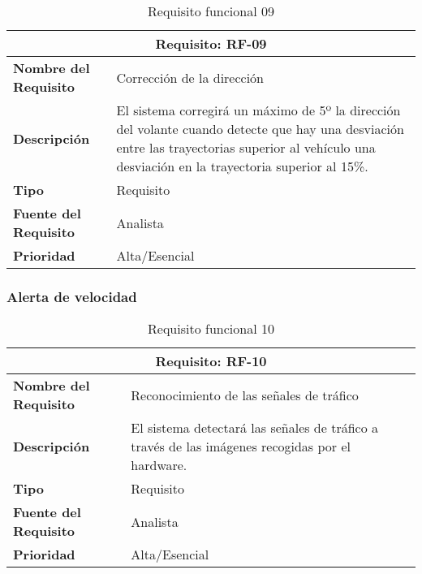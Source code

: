 \begin{table}[H]
\begin{center}
\begin{tabular}{p{} p{7cm}}
\multicolumn{2}{c}{\textbf{Requisito: RF-09} } \\
\hline \hline
\textbf{Nombre del Requisito} &  Corrección de la dirección \\
\hline
\textbf{Descripción} & El sistema corregirá un máximo de 5º la dirección del volante cuando detecte que hay una desviación entre las trayectorias superior al vehículo una desviación en la trayectoria superior al 15\%. \\
\hline
\textbf{Tipo} & Requisito  \\
\hline
\textbf{Fuente del Requisito} & Analista  \\
\hline
\textbf{Prioridad} & Alta/Esencial  \\ \hline
\end{tabular}
\caption{Requisito funcional 09}
\label{tab:RF-09}
\end{center}
\end{table}

\newpage

\subsubsection{Alerta de velocidad}

\begin{table}[H]
\begin{center}
\begin{tabular}{p{} p{7cm}}
\multicolumn{2}{c}{\textbf{Requisito: RF-10} } \\
\hline \hline
\textbf{Nombre del Requisito} & Reconocimiento de las señales de tráfico \\
\hline
\textbf{Descripción} & El sistema detectará las señales de tráfico a través de las imágenes recogidas por el hardware. \\
\hline
\textbf{Tipo} & Requisito  \\
\hline
\textbf{Fuente del Requisito} & Analista  \\
\hline
\textbf{Prioridad} & Alta/Esencial  \\ \hline
\end{tabular}
\caption{Requisito funcional 10}
\label{tab:RF-10}
\end{center}
\end{table}

